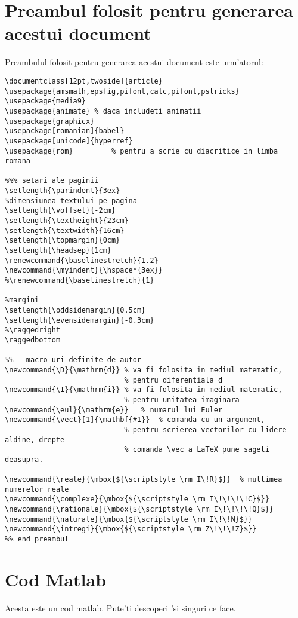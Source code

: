 \section{Preambul folosit pentru generarea acestui document}
\label{sec:preambul}

Preambulul folosit pentru generarea acestui document este urm'atorul:

\begin{small}
\begin{verbatim}
\documentclass[12pt,twoside]{article}  
\usepackage{amsmath,epsfig,pifont,calc,pifont,pstricks}
\usepackage{media9}
\usepackage{animate} % daca includeti animatii
\usepackage{graphicx}	
\usepackage[romanian]{babel}
\usepackage[unicode]{hyperref} 
\usepackage{rom} 		 % pentru a scrie cu diacritice in limba romana	

%%% setari ale paginii
\setlength{\parindent}{3ex}
%dimensiunea textului pe pagina
\setlength{\voffset}{-2cm}
\setlength{\textheight}{23cm}  
\setlength{\textwidth}{16cm}
\setlength{\topmargin}{0cm}
\setlength{\headsep}{1cm}
\renewcommand{\baselinestretch}{1.2}
\newcommand{\myindent}{\hspace*{3ex}}
%\renewcommand{\baselinestretch}{1}

%margini
\setlength{\oddsidemargin}{0.5cm}
\setlength{\evensidemargin}{-0.3cm}
%\raggedright
\raggedbottom

%% - macro-uri definite de autor
\newcommand{\D}{\mathrm{d}}	% va fi folosita in mediul matematic, 
                            % pentru diferentiala d
\newcommand{\I}{\mathrm{i}}	% va fi folosita in mediul matematic, 
                            % pentru unitatea imaginara
\newcommand{\eul}{\mathrm{e}}	% numarul lui Euler
\newcommand{\vect}[1]{\mathbf{#1}}	% comanda cu un argument, 
                            % pentru scrierea vectorilor cu lidere aldine, drepte
                            % comanda \vec a LaTeX pune sageti deasupra.
																										
\newcommand{\reale}{\mbox{${\scriptstyle \rm I\!R}$}}  % multimea numerelor reale
\newcommand{\complexe}{\mbox{${\scriptstyle \rm I\!\!\!\!C}$}}
\newcommand{\rationale}{\mbox{${\scriptstyle \rm I\!\!\!\!Q}$}}
\newcommand{\naturale}{\mbox{${\scriptstyle \rm I\!\!N}$}}
\newcommand{\intregi}{\mbox{${\scriptstyle \rm Z\!\!\!Z}$}}
%% end preambul
\end{verbatim}
\end{small}

\section{Cod Matlab}
\label{sec:codMatlab}

Acesta este un cod matlab. Pute'ti descoperi 'si singuri ce face.


